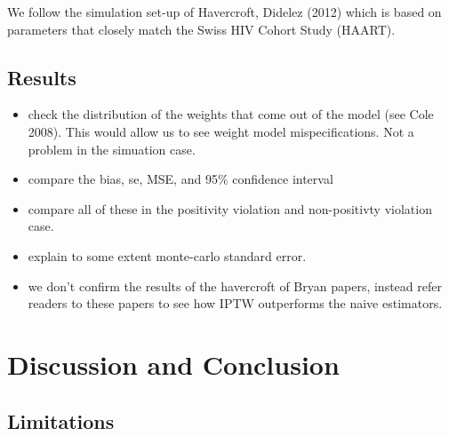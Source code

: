 \documentclass[11pt]{article}
\begin{document}
We follow the simulation set-up of Havercroft, Didelez (2012) which is
based on parameters that closely match the Swiss HIV Cohort Study
(HAART).

\subsection{Results}\label{results}

\begin{itemize}
\item
  check the distribution of the weights that come out of the model (see
  Cole 2008). This would allow us to see weight model mispecifications.
  Not a problem in the simuation case.
\item
  compare the bias, se, MSE, and 95\% confidence interval
\item
  compare all of these in the positivity violation and non-positivty
  violation case.
\item
  explain to some extent monte-carlo standard error.
\item
  we don't confirm the results of the havercroft of Bryan papers,
  instead refer readers to these papers to see how IPTW outperforms the
  naive estimators.
\end{itemize}

    \section{Discussion and Conclusion}\label{discussion-and-conclusion}

\subsection{Limitations}\label{limitations}


    
    



    
    
\end{document}
